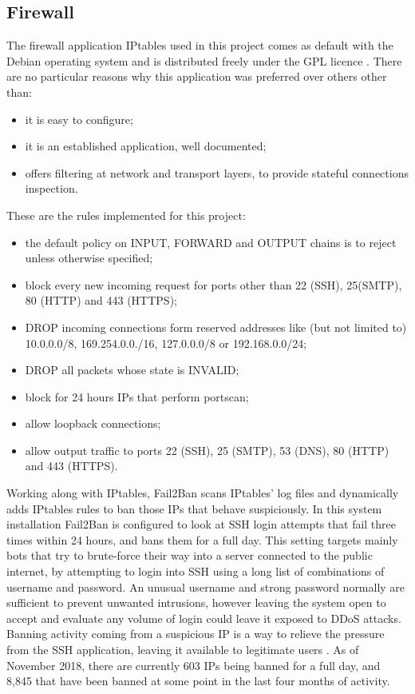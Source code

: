 \subsection{Firewall}
The firewall application IPtables used in this project comes as default with the
Debian operating system and is distributed freely under the GPL licence
\cite{iptables}. There are no particular reasons why this application was
preferred over others other than:
\begin{itemize}
  \item it is easy to configure;
  \item it is an established application, well documented;
  \item offers filtering at network and transport layers, to provide stateful
  connections inspection.
\end{itemize}

These are the rules implemented for this project:
\begin{itemize}
  \item the default policy on INPUT, FORWARD and OUTPUT chains is to reject
  unless otherwise specified;
  \item block every new incoming request for ports other than 22 (SSH),
  25(SMTP), 80 (HTTP) and 443 (HTTPS);
  \item DROP incoming connections form reserved addresses like (but not limited
  to) 10.0.0.0/8, 169.254.0.0./16, 127.0.0.0/8 or 192.168.0.0/24;
  \item DROP all packets whose state is INVALID;
  \item block for 24 hours IPs that perform portscan;
  \item allow loopback connections;
  \item allow output traffic to ports 22 (SSH), 25 (SMTP), 53 (DNS), 80 (HTTP)
  and 443 (HTTPS).
\end{itemize}

Working along with IPtables, Fail2Ban scans IPtables' log files and dynamically
adds IPtables rules to ban those IPs that behave suspiciously. In
this system installation Fail2Ban is configured to look at SSH login attempts
that fail three times within 24 hours, and bans them for a full day. This
setting targets mainly bots that try to brute-force their way into a server
connected to the public internet, by attempting to login into SSH using a
long list of combinations of username and password. An unusual username and
strong password normally are sufficient to prevent unwanted intrusions, however
leaving the system open to accept and evaluate any volume of login could leave
it exposed to DDoS attacks. Banning activity coming from a suspicious IP is a
way to relieve the pressure from the SSH application, leaving it available to
legitimate users \cite{fail2ban}. As of November 2018, there are currently 603
IPs being banned for a full day, and 8,845 that have been banned at some point
in the last four months of activity.


